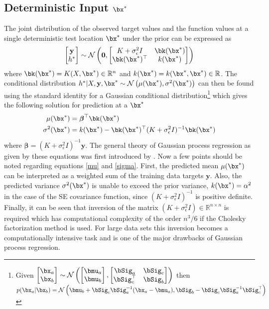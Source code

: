 \subsection{Deterministic Input $\bx^*$}
The joint distribution of the observed target values and the function values at a single deterministic test location $\bx^*$ under the prior can be expressed as
\begin{equation}
\begin{bmatrix}
\mathbf{y} \\
h^*
\end{bmatrix}
\sim \mathcal{N}\left(\mathbf{0},
\begin{bmatrix}
K+\sigma^2_\epsilon I & \bk(\bx^*) \\
\bk(\bx^*)^\top & k(\bx^*)
\end{bmatrix}
\right)
\end{equation}
where $\bk(\bx^*)=K(X,\bx^*) \in \mathbb{R}^n$ and $k(\bx^*)=k(\bx^*,\bx^*) \in \mathbb{R}$. The conditional distribution $h^*|X,\mathbf{y},\bx^* \sim \mathcal{N}\left(\mu(\bx^*),\sigma^2(\bx^*)  \right)$ can then be found using the standard identity for a Gaussian conditional distribution\footnote{
Given $\begin{bmatrix}\bx_a \\ \bx_b\end{bmatrix} \sim \mathcal{N}\left(\begin{bmatrix}\bmu_a \\ \bmu_b\end{bmatrix},\begin{bmatrix}\bSig_a & \bSig_c \\ \bSig_c^\top & \bSig_b\end{bmatrix}  \right)$ then $p(\bx_a|\bx_b) = \mathcal{N}\left( \bmu_b + \bSig_c\bSig_a^{-1}(\bx_a - \bmu_a), \bSig_b - \bSig_c\bSig_a^{-1}\bSig_c^\top  \right)$
} which gives the following solution for prediction at a $\bx^*$
\begin{align}
\mu(\bx^*)&=\boldsymbol{\beta}^\top\bk(\bx^*) \label{mu} \\
\sigma^2(\bx^*)&=k(\bx^*) - \bk(\bx^*)^\top (K+\sigma^2_\epsilon I)^{-1} \bk(\bx^*)  \label{sigma}
\end{align}
where $\boldsymbol{\beta}=(K+\sigma^2_\epsilon I)^{-1}\mathbf{y}$. The general theory of Gaussian process regression as given by these equations was first introduced by \cite{OHa78}. Now a few points should be noted regarding equations \eqref{mu} and \eqref{sigma}. First, the predicted mean $\mu(\bx^*)$ can be interpreted as a weighted sum of the training data targets $\mathbf{y}$. Also, the predicted variance $\sigma^2(\bx^*)$ is unable to exceed the prior variance, $k(\bx^*)=\alpha^2$ in the case of the SE covariance function, since $(K+\sigma^2_\epsilon I)^{-1}$ is positive definite. Finally, it can be seen that inversion of the matrix $(K+\sigma^2_\epsilon I) \in \mathbb{R}^{n \times n}$ is required which has computational complexity of the order $n^3/6$ if the Cholesky factorization method is used. For large data sets this inversion becomes a computationally intensive task and is one of the major drawbacks of Gaussian process regression.

